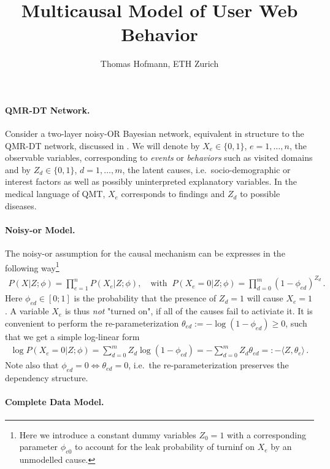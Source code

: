 \documentclass{article}
\title{Multicausal Model of User Web Behavior}
\author{Thomas Hofmann, ETH Zurich}
\begin{document}
\maketitle 

\paragraph{QMR-DT Network.} Consider a two-layer noisy-OR Bayesian network, equivalent in structure to the QMR-DT network, discussed in \cite{shwe1991probabilistic,jaakkola1999variational}. We will denote by $X_e \in \{0,1\}$, $e=1,\dots,n$, the observable variables, corresponding to \textit{events} or \textit{behaviors} such as visited domains and by $Z_d \in \{0,1\}$, $d=1,\dots,m$, the latent causes, i.e.~socio-demographic or interest factors  as well as possibly uninterpreted explanatory variables. In the medical language of QMT, $X_e$ corresponds to findings and $Z_d$ to possible diseases. 

\paragraph{Noisy-or Model.} The noisy-or assumption for the causal mechanism can be expresses in the following way\footnote{Here  we introduce a constant dummy variables $Z_{0}=1$ with a corresponding parameter $\phi_{e0}$ to account for the leak probability of  turninf on $X_e$ by an unmodelled cause.}
\begin{align}
P(X|Z; \phi) = \prod_{e=1}^n P(X_e| Z; \phi), \quad \text{with} \;\; P(X _e=0 | Z; \phi) = \prod_{d=0}^m (1-\phi_{ed})^{Z_{d}} \,.
\label{eq:noisy-or}
\end{align}
Here $\phi_{ed} \in [0;1]$ is the probability that the presence of $Z_d=1$ will cause $X_e=1$. A variable $X_e$ is thus \textit{not} "turned on", if all of the causes fail to activiate it. It is convenient to perform the re-parameterization $\theta_{ed} := -\log (1- \phi_{ed}) \ge 0$, such that we get a simple log-linear form
\begin{align}
\log P(X _e=0 | Z; \phi) = \sum_{d=0}^m Z_d \log (1-\phi_{ed}) = -  \sum_{d=0}^m Z_d \theta_{ed} =: - \langle Z, \theta_e \rangle \,.
\label{eq:log-prob} 
\end{align}
Note also that $\phi_{ed}=0 \iff \theta_{ed}=0$, i.e.~the re-parameterization preserves the dependency structure.

\paragraph{Complete Data Model.} 
\end{document}
